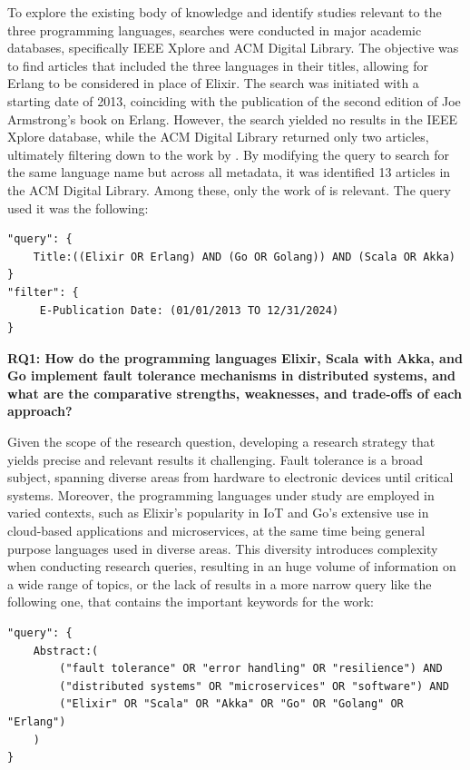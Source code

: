 To explore the existing body of knowledge and identify studies relevant to the three programming languages, searches were conducted in major academic databases, specifically IEEE Xplore and ACM Digital Library. The objective was to find articles that included the three languages in their titles, allowing for Erlang to be considered in place of Elixir. The search was initiated with a starting date of 2013, coinciding with the publication of the second edition of Joe Armstrong's book on Erlang. However, the search yielded no results in the IEEE Xplore database, while the ACM Digital Library returned only two articles, ultimately filtering down to the work by \textcite{Valkov et al}. By modifying the query to search for the same language name but across all metadata, it was identified 13 articles in the ACM Digital Library. Among these, only the work of \textcite{Valkov2018} is relevant. The query used it was the following:

\begin{verbatim}
"query": { 
    Title:((Elixir OR Erlang) AND (Go OR Golang)) AND (Scala OR Akka)
}
"filter": {
     E-Publication Date: (01/01/2013 TO 12/31/2024)
}
\end{verbatim}

\textbf{RQ1: How do the programming languages Elixir, Scala with Akka, and Go implement fault tolerance mechanisms in distributed systems, and what are the comparative
    strengths, weaknesses, and trade-offs of each approach?}

Given the scope of the research question, developing a research strategy that yields precise and relevant results it challenging. Fault tolerance is a broad subject, spanning diverse areas from hardware to electronic devices until critical systems. Moreover, the programming languages under study are employed in varied contexts, such as Elixir’s popularity in \gls{IoT} and Go’s extensive use in cloud-based applications and microservices, at the same time being general purpose languages used in diverse areas. This diversity introduces complexity when conducting research queries, resulting in an huge volume of information on a wide range of topics, or the lack of results in a more narrow query like the following one, that contains the important keywords for the work:

\begin{verbatim}
"query": { 
    Abstract:(
        ("fault tolerance" OR "error handling" OR "resilience") AND
        ("distributed systems" OR "microservices" OR "software") AND 
        ("Elixir" OR "Scala" OR "Akka" OR "Go" OR "Golang" OR "Erlang")
    )
}
\end{verbatim}

